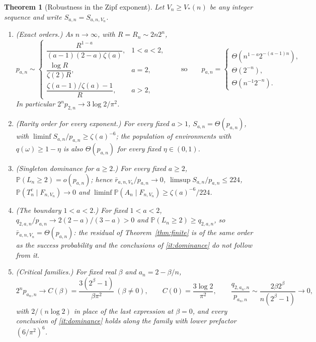 \documentclass[11pt,letterpaper]{article}
\theoremstyle{plain}
\newtheorem{theorem}{Theorem}[section]
\theoremstyle{definition}
\theoremstyle{remark}
\numberwithin{equation}{section}
\newcommand{\PP}{\mathbb P}
\begin{document}
\begin{theorem}[Robustness in the Zipf exponent]\label{thm:robust}
Let $V_n\ge V_*(n)$ be any integer sequence and write $S_{a,n}=S_{a,n,V_n}$.
\begin{enumerate}[label=\textup{(\alph*)}]
\item\label{it:orders} \textup{(Exact orders.)} As $n\to\infty$, with $R=R_n\sim2n2^n$,
\begin{equation}\label{eq:orders}
 p_{a,n}\sim\begin{cases}
 \dfrac{R^{1-a}}{(a-1)(2-a)\zeta(a)},&1<a<2,\\[10pt]
 \dfrac{\log R}{\zeta(2)R},&a=2,\\[8pt]
 \dfrac{\zeta(a-1)/\zeta(a)-1}{R},&a>2,
 \end{cases}
 \qquad\text{so}\qquad
 p_{a,n}=\begin{cases}\Theta(n^{1-a}2^{-(a-1)n}),\\ \Theta(2^{-n}),\\ \Theta(n^{-1}2^{-n}).\end{cases}
\end{equation}
In particular $2^np_{2,n}\to3\log2/\pi^2$.
\item\label{it:order} \textup{(Rarity order for every exponent.)} For every fixed $a>1$, $S_{a,n}=\Theta(p_{a,n})$, with $\liminf S_{a,n}/p_{a,n}\ge\zeta(a)^{-6}$; the population of environments with $q(\omega)\ge1-\eta$ is also $\Theta(p_{a,n})$ for every fixed $\eta\in(0,1)$.
\item\label{it:dominance} \textup{(Singleton dominance for $a\ge2$.)} For every fixed $a\ge2$, $\PP(L_n\ge2)=o(p_{a,n})$; hence $\bar r_{a,n,V_n}/p_{a,n}\to0$, $\limsup S_{a,n}/p_{a,n}\le224$, $\PP(T_n^c\mid F_{n,V_n})\to0$ and $\liminf\PP(A_n\mid F_{n,V_n})\ge\zeta(a)^{-6}/224$.
\item\label{it:boundary} \textup{(The boundary $1<a<2$.)} For fixed $1<a<2$, $q_{2,a,n}/p_{a,n}\to2(2-a)/(3-a)>0$ and $\PP(L_n\ge2)\ge q_{2,a,n}$, so $\bar r_{a,n,V_n}=\Theta(p_{a,n})$: the residual of Theorem~\ref{thm:finite} is of the same order as the success probability and the conclusions of \ref{it:dominance} do not follow from it.
\item\label{it:family} \textup{(Critical families.)} For fixed real $\beta$ and $a_n=2-\beta/n$,
\begin{equation}\label{eq:family}
 2^np_{a_n,n}\to C(\beta)=\frac{3(2^\beta-1)}{\beta\pi^2}\ (\beta\ne0),\qquad C(0)=\frac{3\log2}{\pi^2},\qquad
 \frac{q_{2,a_n,n}}{p_{a_n,n}}\sim\frac{2\beta2^\beta}{n(2^\beta-1)}\to0,
\end{equation}
with $2/(n\log2)$ in place of the last expression at $\beta=0$, and every conclusion of \ref{it:dominance} holds along the family with lower prefactor $(6/\pi^2)^6$.
\end{enumerate}
\end{theorem}
\end{document}
